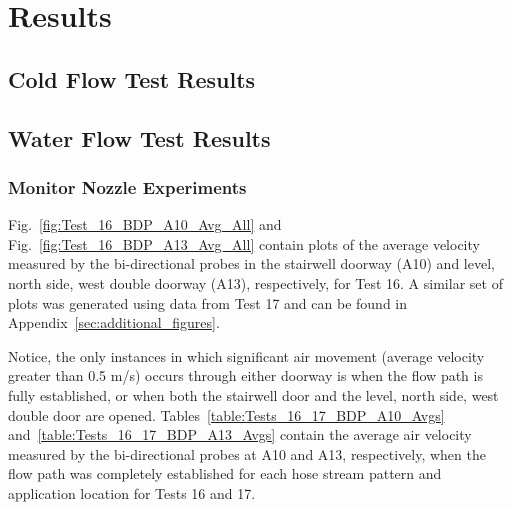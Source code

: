 \documentclass[12pt,oneside]{book}
\begin{document}
\chapter{Results}
\label{chap:Results}

\section{Cold Flow Test Results}
\label{sec:Cold_Flow_Test_Results}

\section{Water Flow Test Results}
\label{sec:Water_Flow_Test_Results}

\subsection{Monitor Nozzle Experiments}

Fig.~\ref{fig:Test_16_BDP_A10_Avg_All} and Fig.~\ref{fig:Test_16_BDP_A13_Avg_All} contain plots of the average velocity measured by the bi-directional probes in the stairwell doorway (A10) and  level, north side, west double doorway (A13), respectively, for Test 16. A similar set of plots was generated using data from Test 17 and can be found in Appendix~\ref{sec:additional_figures}.

Notice, the only instances in which significant air movement (average velocity greater than 0.5 m/s) occurs through either doorway is when the flow path is fully established, or when both the stairwell door and the  level, north side, west double door are opened. Tables~\ref{table:Tests_16_17_BDP_A10_Avgs} and~\ref{table:Tests_16_17_BDP_A13_Avgs} contain the average air velocity measured by the bi-directional probes at A10 and A13, respectively, when the flow path was completely established for each hose stream pattern and application location for Tests 16 and 17.
\end{document}

